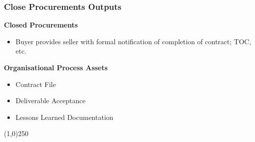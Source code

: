 \begin{frame}
\frametitle{Close Procurements  \hfill\hfill Outputs}
\textbf{Closed Procurements}
		\begin{itemize}
			\item Buyer provides seller with formal notification of completion of contract; TOC, etc.
		\end{itemize}
\textbf{Organisational Process Assets}
	\begin{itemize}
		\item Contract File
		\item Deliverable Acceptance
		\item Lessons Learned Documentation
	\end{itemize}
\end{frame}\begin{center}\line(1,0){250}\end{center}




